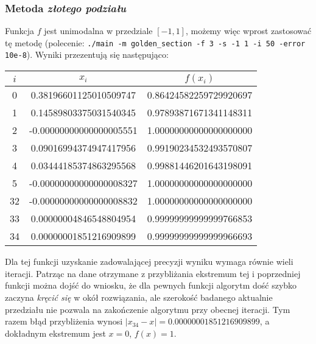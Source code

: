 \documentclass[a4paper,11pt]{article}
\begin{document}
    \subsubsection{Metoda \emph{złotego podziału}}
    Funkcja $ f $ jest unimodalna w przedziale $ [-1,1] $, możemy więc wprost zastosować tę metodę (polecenie: \texttt{./main -m golden\_section -f 3 -s -1 1 -i 50 -error 10e-8}). Wyniki przezentują się następująco:
      \begin{center}
      \begin{tabular}{S[table-format=1.0]S[table-format=-1.9]S[table-format=-1.15,table-auto-round=false]}
        \toprule
        {$i$}                & {$x_i$}               & {$f(x_i)$}            \\  & 0.38196601125010509747 & 0.86424582259729920697 \\
          1 & 0.14589803375031540345 & 0.97893871671341148311 \\
          2 & -0.00000000000000005551 & 1.00000000000000000000 \\
          3 & 0.09016994374947417956 & 0.99190234532493570807 \\
          4 & 0.03444185374863295568 & 0.99881446201643198091 \\
          5 & -0.00000000000000008327 & 1.00000000000000000000 \\
          32 & -0.00000000000000008832 & 1.00000000000000000000 \\
          33 & 0.00000004846548804954 & 0.99999999999999766853 \\
          34 & 0.00000001851216909899 & 0.99999999999999966693 \\ \bottomrule
        \end{tabular}
    \end{center}
    Dla tej funkcji uzyskanie zadowalającej precyzji wyniku wymaga równie wieli iteracji. Patrząc na dane otrzymane z przybliżania ekstremum tej i poprzedniej funkcji można dojść do wniosku, że dla pewnych funkcji algorytm dość szybko zaczyna \emph{kręcić się} w okół rozwiązania, ale szerokość badanego aktualnie przedziału nie pozwala na zakończenie algorytmu przy obecnej iteracji. Tym razem błąd przybliżenia wynosi $ |x_{34} - x| = 0.00000001851216909899 $, a dokładnym ekstremum jest $ x = 0 $, $ f(x) = 1$.
    
\end{document}
